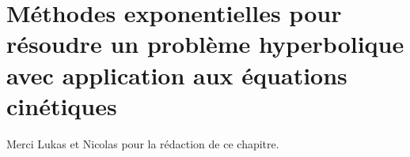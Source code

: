 \newcommand{\localPath}{../chap1}

\clearemptydoublepage
\chapter[Méthodes exponentielles appliquées aux équations cinétiques]{Méthodes exponentielles pour résoudre un problème hyperbolique avec application aux équations cinétiques}


Merci Lukas et Nicolas pour la rédaction de ce chapitre.

